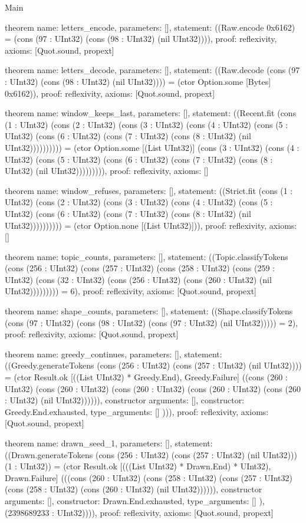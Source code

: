 \begin{lexlean}{Main}
\begin{semanticmodule}
theorem{
  name: letters_encode,
  parameters: [],
  statement: ((Raw.encode 0x6162) = (cons (97 : UInt32) (cons (98 : UInt32) (nil UInt32)))),
  proof: reflexivity{},
  axioms: [Quot.sound, propext]
}

theorem{
  name: letters_decode,
  parameters: [],
  statement: ((Raw.decode (cons (97 : UInt32) (cons (98 : UInt32) (nil UInt32)))) = (ctor Option.some [Bytes] 0x6162)),
  proof: reflexivity{},
  axioms: [Quot.sound, propext]
}

theorem{
  name: window_keeps_last,
  parameters: [],
  statement: ((Recent.fit (cons (1 : UInt32) (cons (2 : UInt32) (cons (3 : UInt32) (cons (4 : UInt32) (cons (5 : UInt32) (cons (6 : UInt32) (cons (7 : UInt32) (cons (8 : UInt32) (nil UInt32)))))))))) = (ctor Option.some [(List UInt32)] (cons (3 : UInt32) (cons (4 : UInt32) (cons (5 : UInt32) (cons (6 : UInt32) (cons (7 : UInt32) (cons (8 : UInt32) (nil UInt32))))))))),
  proof: reflexivity{},
  axioms: []
}

theorem{
  name: window_refuses,
  parameters: [],
  statement: ((Strict.fit (cons (1 : UInt32) (cons (2 : UInt32) (cons (3 : UInt32) (cons (4 : UInt32) (cons (5 : UInt32) (cons (6 : UInt32) (cons (7 : UInt32) (cons (8 : UInt32) (nil UInt32)))))))))) = (ctor Option.none [(List UInt32)])),
  proof: reflexivity{},
  axioms: []
}

theorem{
  name: topic_counts,
  parameters: [],
  statement: ((Topic.classifyTokens (cons (256 : UInt32) (cons (257 : UInt32) (cons (258 : UInt32) (cons (259 : UInt32) (cons (32 : UInt32) (cons (256 : UInt32) (cons (260 : UInt32) (nil UInt32))))))))) = 6),
  proof: reflexivity{},
  axioms: [Quot.sound, propext]
}

theorem{
  name: shape_counts,
  parameters: [],
  statement: ((Shape.classifyTokens (cons (97 : UInt32) (cons (98 : UInt32) (cons (97 : UInt32) (nil UInt32))))) = 2),
  proof: reflexivity{},
  axioms: [Quot.sound, propext]
}

theorem{
  name: greedy_continues,
  parameters: [],
  statement: ((Greedy.generateTokens (cons (256 : UInt32) (cons (257 : UInt32) (nil UInt32)))) = (ctor Result.ok [((List UInt32) * Greedy.End), Greedy.Failure] ((cons (260 : UInt32) (cons (260 : UInt32) (cons (260 : UInt32) (cons (260 : UInt32) (cons (260 : UInt32) (nil UInt32)))))), constructor{
    arguments: [],
    constructor: Greedy.End.exhausted,
    type_arguments: []
  }))),
  proof: reflexivity{},
  axioms: [Quot.sound, propext]
}

theorem{
  name: drawn_seed_1,
  parameters: [],
  statement: ((Drawn.generateTokens (cons (256 : UInt32) (cons (257 : UInt32) (nil UInt32))) (1 : UInt32)) = (ctor Result.ok [(((List UInt32) * Drawn.End) * UInt32), Drawn.Failure] (((cons (260 : UInt32) (cons (258 : UInt32) (cons (257 : UInt32) (cons (258 : UInt32) (cons (260 : UInt32) (nil UInt32)))))), constructor{
    arguments: [],
    constructor: Drawn.End.exhausted,
    type_arguments: []
  }), (2398689233 : UInt32)))),
  proof: reflexivity{},
  axioms: [Quot.sound, propext]
}


\end{semanticmodule}
\end{lexlean}
